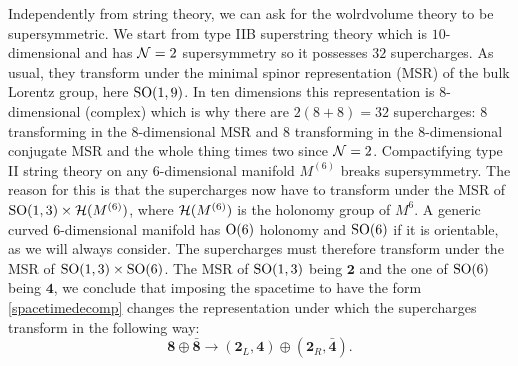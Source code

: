         Independently from string theory, we can ask for the wolrdvolume theory to be supersymmetric. We start from type IIB superstring theory which is $10$-dimensional and has $\mathcal{N}=2$ supersymmetry so it possesses $32$ supercharges. As usual, they transform under the minimal spinor representation (MSR) of the bulk Lorentz group, here $\text{SO}(1,9)$. In ten dimensions this representation is $8$-dimensional (complex) which is why there are $2(8+8)=32$ supercharges: $8$ transforming in the $8$-dimensional MSR and $8$ transforming in the $8$-dimensional conjugate MSR and the whole thing times two since $\mathcal{N}=2$. Compactifying type II string theory on any $6$-dimensional manifold $M^{(6)}$ breaks supersymmetry. The reason for this is that the supercharges now have to transform under the MSR of $\text{SO}(1,3)\times\mathcal{H}(M^{(6)})$, where $\mathcal{H}(M^{(6)})$ is the holonomy group of $M^{6}$. A generic curved $6$-dimensional manifold has $\text{O}(6)$ holonomy and $\text{SO}(6)$ if it is orientable, as we will always consider. The supercharges must therefore transform under the MSR of $\text{SO}(1,3)\times\text{SO}(6)$. The MSR of $\text{SO}(1,3)$ being $\boldsymbol{2}$ and the one of $\text{SO}(6)$ being $\boldsymbol{4}$, we conclude that imposing the spacetime to have the form \eqref{spacetimedecomp} changes the representation under which the supercharges transform in the following way:
        \begin{equation}
            \boldsymbol{8}\oplus\bar{\boldsymbol{8}}\to (\boldsymbol{2}_L,\boldsymbol{4})\oplus(\boldsymbol{2}_R,\bar{\boldsymbol{4}}).
        \end{equation}
